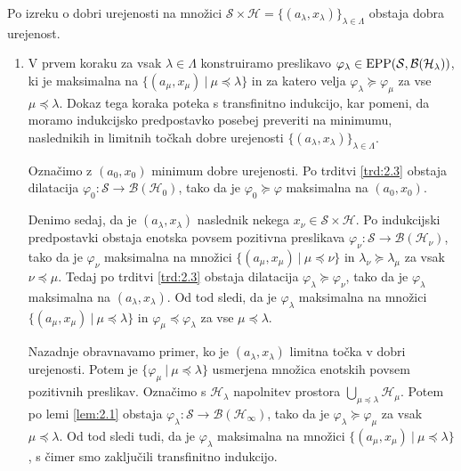 \begin{dokaz}
    Po izreku o dobri urejenosti na množici $\mathcal{S} \times \mathcal{H} = \{(a_\lambda, x_\lambda)\}_{\lambda \in \Lambda}$ obstaja dobra urejenost.
    \begin{enumerate}
        \item V prvem koraku za vsak $\lambda \in \Lambda$ konstruiramo preslikavo $\varphi_\lambda \in \operatorname{EPP}( \mathcal{S}, \mathcal{B} (\mathcal{H}_\lambda))$,
        ki je maksimalna na $\{(a_\mu, x_\mu) \ |\ \mu \preceq \lambda\}$
        in za katero velja $\varphi_\lambda \succeq \varphi_\mu$ za vse $\mu \preceq \lambda$.
        Dokaz tega koraka poteka s transfinitno indukcijo, kar pomeni, da moramo indukcijsko predpostavko 
        posebej preveriti na minimumu, naslednikih in limitnih točkah dobre urejenosti $\{(a_\lambda, x_\lambda)\}_{\lambda \in \Lambda}$.

        Označimo z $(a_0, x_0)$ minimum dobre urejenosti. Po trditvi \ref{trd:2.3} obstaja dilatacija $\varphi_0: \mathcal{S} \to \mathcal{B}(\mathcal{H}_0)$,
        tako da je $\varphi_0 \succeq \varphi$ maksimalna na $(a_0, x_0)$.    

        Denimo sedaj, da je $(a_\lambda, x_\lambda)$ naslednik nekega $x_\nu \in \mathcal{S} \times \mathcal{H}$.
        Po indukcijski predpostavki obstaja enotska povsem pozitivna preslikava $\varphi_\nu: \mathcal{S} \to \mathcal{B}(\mathcal{H}_\nu)$,
        tako da je $\varphi_\nu$ maksimalna na množici $\{(a_\mu, x_\mu) \ |\ \mu \preceq \nu\}$ in $\lambda_\nu \succeq \lambda_\mu$
        za vsak $\nu \preceq \mu$.
        Tedaj po trditvi \ref{trd:2.3} obstaja dilatacija $\varphi_\lambda \succeq \varphi_\nu$,
        tako da je $\varphi_\lambda$ maksimalna na $(a_\lambda, x_\lambda)$. Od tod sledi, da je 
        $\varphi_\lambda$ maksimalna na množici $\{(a_\mu, x_\mu) \ |\ \mu \preceq \lambda\}$ in $\varphi_\mu \preceq \varphi_\lambda$
        za vse $\mu \preceq \lambda$.

        Nazadnje obravnavamo primer, ko je $(a_\lambda, x_\lambda)$ limitna točka v dobri urejenosti.
        Potem je $\{\varphi_\mu\ |\ \mu \preceq \lambda\}$ usmerjena množica enotskih povsem pozitivnih preslikav.
        Označimo s $\mathcal{H}_\lambda$ napolnitev prostora $\bigcup_{\mu \preceq \lambda} \mathcal{H}_\mu$.
        Potem po lemi
        \ref{lem:2.1} obstaja $\varphi_\lambda: \mathcal{S} \to \mathcal{B} (\mathcal{H}_\infty)$, tako da je $\varphi_\lambda \succeq \varphi_\mu$
        za vsak $\mu \preceq \lambda$. Od tod sledi tudi, da je $\varphi_\lambda$ maksimalna na množici $\{(a_\mu, x_\mu)\ |\ \mu \preceq \lambda\}$,
        s čimer smo zaključili transfinitno indukcijo. 


\end{enumerate}
\end{dokaz}

